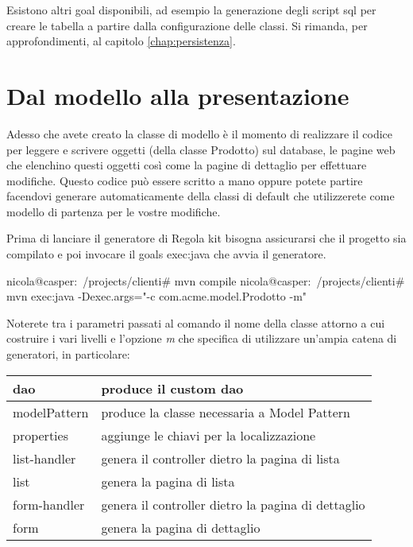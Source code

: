 \begin{nota}
Esistono altri goal disponibili, ad esempio la generazione degli script sql per creare le tabella a partire dalla configurazione delle classi. Si rimanda, per approfondimenti, al capitolo \vref{chap:persistenza}.
\end{nota}

\section{Dal modello alla presentazione}
Adesso che avete creato la classe di modello è il momento di realizzare il codice per leggere e scrivere oggetti (della classe Prodotto) sul database, le pagine web che elenchino questi oggetti così come la pagine di dettaglio per effettuare modifiche. Questo codice può essere scritto a mano oppure potete partire facendovi generare automaticamente della classi di default che utilizzerete come modello di partenza per le vostre modifiche.

 Prima di lanciare il generatore di Regola kit bisogna assicurarsi che il progetto sia compilato e poi invocare il goals exec:java che avvia il generatore. 

\begin{bash}
nicola@casper:~/projects/clienti# mvn compile
nicola@casper:~/projects/clienti# mvn exec:java -Dexec.args="-c com.acme.model.Prodotto -m"
\end{bash}

Noterete tra i parametri passati al comando il nome della classe attorno a cui costruire i vari livelli e l'opzione \emph{m} che specifica di utilizzare un'ampia catena di generatori, in particolare:

\begin{center}
{
  \begin{tabular}{ | l | p{9cm} | }
  \hline
  dao &  produce il custom dao \\ \hline
  modelPattern & produce la classe necessaria a Model Pattern   \\ \hline
  properties & aggiunge le chiavi per la localizzazione \\ \hline
  list-handler & genera il controller dietro la pagina di lista \\ \hline
  list &  genera la pagina di lista\\ \hline
  form-handler & genera il controller dietro la pagina di dettaglio\\ \hline
  form &  genera la pagina di dettaglio \\ \hline
  \end{tabular}
}
\end{center}


